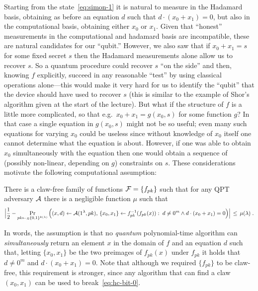 Starting from the state~\eqref{eq:simon-1} it is natural to measure in the Hadamard basis, obtaining as before an equation $d$ such that $d\cdot(x_0+ x_1)=0$, but also in the computational basis, obtaining either $x_0$ or $x_1$. Given that ``honest'' measurements in the computational and hadamard basis are incompatible, these are natural candidates for our ``qubit.'' However, we also saw that if $x_0+ x_1 = s$ for some fixed secret $s$ then the Hadamard measurements alone allow us to recover $s$. So a quantum procedure could recover $s$ ``on the side'' and then, knowing $f$ explicitly, succeed in any reasonable ``test'' by using classical operations alone---this would make it very hard for us to identify the ``qubit'' that the device should have used to recover $s$ (this is similar to the example of Shor's algorithm given at the start of the lecture). But what if the structure of $f$ is a little more complicated, so that e.g.\ $x_0 + x_1 = g(x_0,s)$ for some function $g$? In that case a single equation in $g(x_0,s)$ might not be so useful; even many such equations for varying $x_0$ could be useless since without knowledge of $x_0$ itself one cannot determine what the equation is about. However, if one was able to obtain $x_0$ simultaneously with the equation then one would obtain a sequence of (possibly non-linear, depending on $g$) constraints on $s$. These considerations motivate the following computational assumption:

\begin{assumption}\label{ass:hc-bit}
There is a claw-free family of functions $\mathcal{F} = \{f_{pk}\}$ such that  for any QPT adversary $\mathcal{A}$ there is a negligible function $\mu$ such that 
\begin{equation}\label{eq:hc-bit-0}
\Big|\frac{1}{2} -  \Pr_{pk\leftarrow_R \{0,1\}^{k(\lambda)}}\Big( (x,d)\leftarrow \mathcal{A}(1^\lambda,pk),\, \{x_0,x_1\}\leftarrow f_{pk}^{-1}(f_{pk}(x)):\; d\neq 0^m \wedge d\cdot ( x_0+x_1) = 0\Big)\Big| \,\leq\, \mu(\lambda)\;.
\end{equation}
\end{assumption}

In words, the assumption is that no \emph{quantum} polynomial-time algorithm can \emph{simultaneously} return an element $x$ in the domain of $f$ and an equation $d$ such that, letting $\{x_0,x_1\}$ be the two preimages of $f_{pk}(x)$ under $f_{pk}$ it holds that $d\neq 0^m$ and $d\cdot (x_0+x_1)=0$. Note that although we required $\{f_{pk}\}$ to be claw-free, this requirement is stronger, since any algorithm that can find a claw $(x_0,x_1)$ can be used to break~\eqref{eq:hc-bit-0}.

